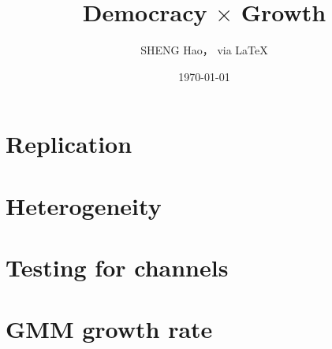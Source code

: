 \documentclass{article}
\begin{document}
\title{Democracy $\times$ Growth}   
\author{{\normalsize SHENG Hao， via \LaTeX}}
\date{\today}

\maketitle

\def \Pr{{\rm Pr}}
\baselineskip 0.6cm

\section{Replication}

\newpage
\section{Heterogeneity}

\newpage
\section{Testing for channels}




\newpage
\section{GMM growth rate}

\end{document}
